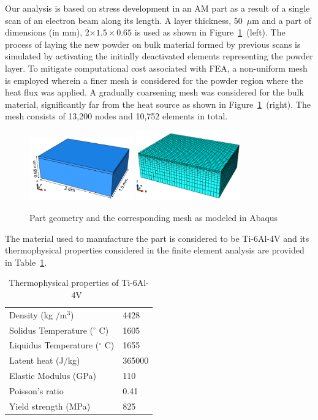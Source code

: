 Our analysis is based on stress development in an AM part as a result of a single scan of an 
electron beam along its
length. A layer thickness, 50~$\mu$m and a part of dimensions (in mm), 2$\times 1.5\times 0.65$ is used as shown
in Figure~\ref{fig:PartwMesh}~(left). 
The process of laying the new powder on bulk material formed by previous scans is simulated 
by activating the initially deactivated elements representing the powder layer. To mitigate computational cost
associated with FEA, a non-uniform mesh is employed wherein a finer mesh is considered for the powder
region where the heat flux was applied. A gradually coarsening mesh was considered for the bulk material, significantly far 
from the heat source as shown in Figure~\ref{fig:PartwMesh}~(right). The mesh consists of 13,200 nodes and 
10,752 elements in total. 
%
\begin{figure}[htbp]
\begin{center}
\includegraphics[width=0.4\textwidth]{./Figures/EBM_PartwXYZ} 
\includegraphics[width=0.4\textwidth]{./Figures/meshwXYZ}
\end{center}
\caption{Part geometry and the corresponding mesh as modeled in Abaqus}
\label{fig:PartwMesh}
\end{figure}
%
The material used to manufacture the part is considered to be Ti-6Al-4V and its
thermophysical properties considered in the finite element analysis are provided in Table~\ref{tab:matProp}.
%
\begin{table}[htbp]
\centering
\caption{Thermophysical properties of Ti-6Al-4V~\cite{Fu:2014}}
\label{tab:matProp}
\vspace{1mm}
\begin{tabular}{ ll }
\toprule
    Density (kg $/$m$^3$) & 4428\\
    Solidus Temperature ($^\circ$ C) & 1605 \\
    Liquidus Temperature ($^\circ$ C) & 1655\\
    Latent heat (J$/$kg) & 365000\\
    Elastic Modulus (GPa) & 110 \\
    Poisson's ratio & 0.41\\
    Yield strength (MPa) & 825\\
\bottomrule
\end{tabular}
\end{table}

